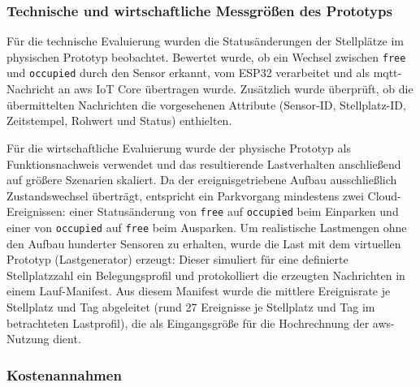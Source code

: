 \subsubsection{Technische und wirtschaftliche Messgrößen des Prototyps}

Für die technische Evaluierung wurden die Statusänderungen der Stellplätze im physischen Prototyp beobachtet. Bewertet wurde, ob ein Wechsel zwischen \texttt{free} und \texttt{occupied} durch den Sensor erkannt, vom ESP32 verarbeitet und als \ac{mqtt}-Nachricht an \ac{aws} IoT Core übertragen wurde. Zusätzlich wurde überprüft, ob die übermittelten Nachrichten die vorgesehenen Attribute (Sensor-ID, Stellplatz-ID, Zeitstempel, Rohwert und Status) enthielten.

Für die wirtschaftliche Evaluierung wurde der physische Prototyp als Funktionsnachweis verwendet und das resultierende Lastverhalten anschließend auf größere Szenarien skaliert. Da der ereignisgetriebene Aufbau ausschließlich Zustandswechsel überträgt, entspricht ein Parkvorgang mindestens zwei Cloud-Ereignissen: einer Statusänderung von \texttt{free} auf \texttt{occupied} beim Einparken und einer von \texttt{occupied} auf \texttt{free} beim Ausparken. Um realistische Lastmengen ohne den Aufbau hunderter Sensoren zu erhalten, wurde die Last mit dem virtuellen Prototyp (Lastgenerator) erzeugt: Dieser simuliert für eine definierte Stellplatzzahl ein Belegungsprofil und protokolliert die erzeugten Nachrichten in einem Lauf-Manifest. Aus diesem Manifest wurde die mittlere Ereignisrate je Stellplatz und Tag abgeleitet (rund 27 Ereignisse je Stellplatz und Tag im betrachteten Lastprofil), die als Eingangsgröße für die Hochrechnung der \ac{aws}-Nutzung dient.

\subsubsection{Kostenannahmen}

